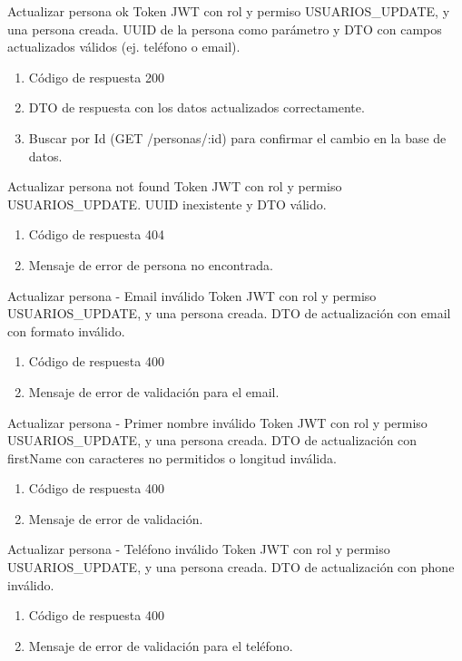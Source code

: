 {Actualizar persona ok}
{Token JWT con rol y permiso USUARIOS\_UPDATE, y una persona creada.}
{UUID de la persona como parámetro y DTO con campos actualizados válidos (ej. teléfono o email).}
{\begin{enumerate} [leftmargin=*, nosep]
    \item Código de respuesta 200
    \item DTO de respuesta con los datos actualizados correctamente.
    \item Buscar por Id (GET /personas/:id) para confirmar el cambio en la base de datos.
\end{enumerate}}

{Actualizar persona not found}
{Token JWT con rol y permiso USUARIOS\_UPDATE.}
{UUID inexistente y DTO válido.}
{\begin{enumerate} [leftmargin=*, nosep]
    \item Código de respuesta 404
    \item Mensaje de error de persona no encontrada.
\end{enumerate}}

{Actualizar persona - Email inválido}
{Token JWT con rol y permiso USUARIOS\_UPDATE, y una persona creada.}
{DTO de actualización con email con formato inválido.}
{\begin{enumerate} [leftmargin=*, nosep]
    \item Código de respuesta 400
    \item Mensaje de error de validación para el email.
\end{enumerate}}

{Actualizar persona - Primer nombre inválido}
{Token JWT con rol y permiso USUARIOS\_UPDATE, y una persona creada.}
{DTO de actualización con firstName con caracteres no permitidos o longitud inválida.}
{\begin{enumerate} [leftmargin=*, nosep]
    \item Código de respuesta 400
    \item Mensaje de error de validación.
\end{enumerate}}

{Actualizar persona - Teléfono inválido}
{Token JWT con rol y permiso USUARIOS\_UPDATE, y una persona creada.}
{DTO de actualización con phone inválido.}
{\begin{enumerate} [leftmargin=*, nosep]
    \item Código de respuesta 400
    \item Mensaje de error de validación para el teléfono.
\end{enumerate}}

